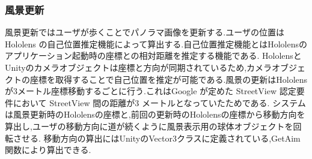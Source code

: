 \clearpage

\subsubsection{風景更新}
風景更新ではユーザが歩くことでパノラマ画像を更新する.ユーザの位置はHololens の自己位置推定機能によって算出する.自己位置推定機能とはHololensのアプリケーション起動時の座標との相対距離を推定する機能である. HololensとUnityのカメラオブジェクトは座標と方向が同期されているため,カメラオブジェクトの座標を取得することで自己位置を推定が可能である.風景の更新はHololensが3メートル座標移動するごとに行う.これはGoogle が定めた StreetView 認定要件において StreetView 間の距離が3 メートルとなっていたためである.
システムは風景更新時のHololensの座標と,前回の更新時のHololensの座標から移動方向を算出し,ユーザの移動方向に道が続くように風景表示用の球体オブジェクトを回転させる.
移動方向の算出にはUnityのVector3クラスに定義されている,GetAim関数により算出できる.